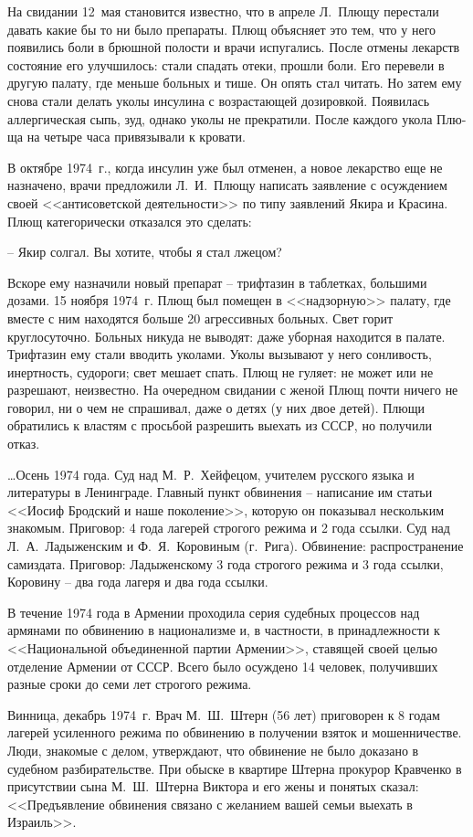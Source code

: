 \documentclass{book}
\begin{document}
На свидании 12~мая становится известно, что в апреле Л.~Плю­щу перестали давать какие бы то ни было препараты. Плющ объясняет это тем, что у него появились боли в брюшной поло­сти и врачи испугались. После отмены лекарств состояние его улучшилось: стали спадать отеки, прошли боли. Его перевели в другую палату, где меньше больных и тише. Он опять стал читать. Но затем ему снова стали делать уколы инсулина с возрастающей дозировкой. Появилась аллергическая сыпь, зуд, однако уколы не прекратили. После каждого укола Плю­ща на четыре часа привязывали к кровати.

В октябре 1974~г., когда инсулин уже был отменен, а но­вое лекарство еще не назначено, врачи предложили Л.~И.~Плю­щу написать заявление с осуждением своей <<антисоветской деятельности>> по типу заявлений Якира и Красина. Плющ кате­горически отказался это сделать:

-- Якир солгал. Вы хотите, чтобы я стал лжецом?

Вскоре ему назначили новый препарат -- трифтазин в таблетках, большими дозами. 15 ноября 1974~г. Плющ был помещен в <<надзорную>> палату, где вместе с ним находятся больше 20 агрессивных больных. Свет горит круглосуточно. Больных никуда не выводят: даже уборная находится в палате. Трифтазин ему стали вводить уколами. Уколы вызывают у него сон­ливость, инертность, судороги; свет мешает спать. Плющ не гуляет: не может или не разрешают, неизвестно. На очередном свидании с женой Плющ почти ничего не говорил, ни о чем не спрашивал, даже о детях (у них двое детей). Плющи обрати­лись к властям с просьбой разрешить выехать из СССР, но получили отказ.

\ldots Осень 1974 года. Суд над М.~Р.~Хейфецом, учителем русского языка и литературы в Ленинграде. Главный пункт обвинения -- написание им статьи <<Иосиф Бродский и наше поколение>>, которую он показывал нескольким знакомым. Приговор: 4 года лагерей строгого режима и 2 года ссылки. Суд над Л.~А.~Ладыженским и Ф.~Я.~Коровиным (г.~Рига). Обвинение: распространение самиздата. Приговор: Ладыженскому 3 года строгого режима и 3 года ссылки, Коровину -- два года лагеря и два года ссылки.

В течение 1974 года в Армении проходила серия судебных процессов над армянами по обвинению в национализме и, в частности, в принадлежности к <<Национальной объединенной партии Армении>>, ставящей своей целью отделение Армении от СССР. Всего было осуждено 14 человек, получивших разные сроки до семи лет строгого режима.

Винница, декабрь 1974~г. Врач М.~Ш.~Штерн (56 лет) приговорен к 8 годам лагерей усиленного режима по обвинению в получении взяток и мошенничестве. Люди, знакомые с делом, утверждают, что обвинение не было доказано в судебном разбирательстве. При обыске в квартире Штерна прокурор Кравченко в присутствии сына М.~Ш.~Штерна Виктора и его жены и понятых сказал: <<Предъявление обвинения связано с желанием вашей семьи выехать в Израиль>>.
\end{document}
